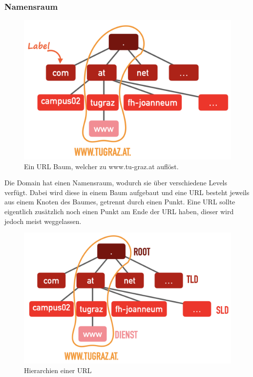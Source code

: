 \documentclass{article}
\begin{document}
	 \subsubsection{Namensraum}
	 \begin{figure}[H]
	 \centering
	 \includegraphics{Bilder/URL.png}
	 \caption{Ein URL Baum, welcher zu www.tu-graz.at auflöst.}
	 \end{figure}
	 Die Domain hat einen Namensraum, wodurch sie über verschiedene Levels verfügt. Dabei wird diese in einem Baum aufgebaut und eine URL besteht jeweils aus einem Knoten des Baumes, getrennt durch einen Punkt. Eine URL sollte eigentlich zusätzlich noch einen Punkt am Ende der URL haben, dieser wird jedoch meist weggelassen. \\
	 \begin{figure}[H]
	 \centering
	 \includegraphics{Bilder/DNS.png}
	 \caption{Hierarchien einer URL}
	 \end{figure}
\end{document}
